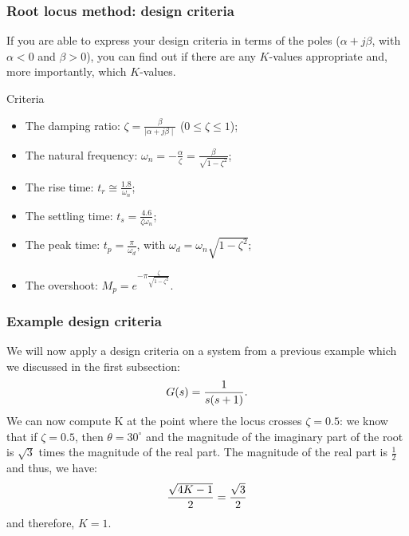 \begin{frame}
\frametitle{Root locus method: design criteria}
	If you are able to express your design criteria in terms of the poles ($\alpha + j\beta$, with $\alpha < 0$ and $\beta>0$), you can find out if there are any $K$-values appropriate and, more importantly, which $K$-values.\\
	\begin{block}{Criteria}
	\begin{itemize}
		\item The damping ratio: $\zeta = \frac{\beta}{\mid \alpha + j\beta\mid}$ ($0 \leq \zeta \leq 1$);
		\item The natural frequency: $\omega_n = -\frac{\alpha}{\zeta} = \frac{\beta}{\sqrt{1 - \zeta^2}}$;
		\item The rise time: $t_r \cong \frac{1.8}{\omega_n}$;
		\item The settling time: $t_s = \frac{4.6}{\zeta \omega_n}$;
		\item The peak time: $t_p =\frac{\pi}{\omega_d}$, with $\omega_d = \omega_n \sqrt{1 - \zeta^2} $;
		\item The overshoot: $M_p = e^{-\pi \frac{\zeta}{\sqrt{1 - \zeta^2}}}$.
	\end{itemize}
	\end{block}
\end{frame}

\begin{frame}
\frametitle{Example design criteria}
	\begin{example}
		We will now apply a design criteria on a system from a previous example which we discussed in the first subsection:
		\vspace{-0.5em}
		\begin{equation}
		G(s) = \frac{1}{s(s+1)}.
		\vspace{-0.5em}
		\end{equation}
		We can now compute K at the point where the locus crosses $\zeta = 0.5$: we know that if $\zeta = 0.5$, then $\theta = 30^{\circ}$ and the magnitude of the imaginary part of the root is $\sqrt{3}$ times the magnitude of the real part. The magnitude of the real part is $\frac{1}{2}$ and thus, we have:
		\vspace{-0.5em}
		\begin{equation}
		\frac{\sqrt{4K - 1}}{2} = \frac{\sqrt{3}}{2}
		\vspace{-0.5em}
		\end{equation}
		and therefore, $K = 1$.
	\end{example}
\end{frame}

